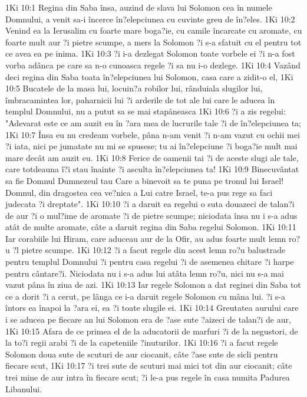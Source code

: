 1Ki 10:1  Regina din Saba însa, auzind de slava lui Solomon cea în numele Domnului, a venit sa-i încerce în?elepciunea cu cuvinte greu de în?eles.
1Ki 10:2  Venind ea la Ierusalim cu foarte mare boga?ie, cu camile încarcate cu aromate, cu foarte mult aur ?i pietre scumpe, a mers la Solomon ?i s-a sfatuit cu el pentru tot ce avea ea pe inima.
1Ki 10:3  ?i i-a dezlegat Solomon toate vorbele ei ?i n-a fost vorba adânca pe care sa n-o cunoasca regele ?i sa nu i-o dezlege.
1Ki 10:4  Vazând deci regina din Saba toata în?elepciunea lui Solomon, casa care a zidit-o el,
1Ki 10:5  Bucatele de la masa lui, locuin?a robilor lui, rânduiala slugilor lui, îmbracamintea lor, paharnicii lui ?i arderile de tot ale lui care le aducea în templul Domnului, nu a putut sa se mai stapâneasca
1Ki 10:6  ?i a zis regelui: "Adevarat este ce am auzit eu în ?ara mea de lucrurile tale ?i de în?elepciunea ta;
1Ki 10:7  Însa eu nu credeam vorbele, pâna n-am venit ?i n-am vazut cu ochii mei ?i iata, nici pe jumatate nu mi se spusese; tu ai în?elepciune ?i boga?ie mult mai mare decât am auzit eu.
1Ki 10:8  Ferice de oamenii tai ?i de aceste slugi ale tale, care totdeauna î?i stau înainte ?i asculta în?elepciunea ta!
1Ki 10:9  Binecuvântat sa fie Domnul Dumnezeul tau Care a binevoit sa te puna pe tronul lui Israel! Domnul, din dragostea cea ve?nica a Lui catre Israel, te-a pus rege sa faci judecata ?i dreptate".
1Ki 10:10  ?i a daruit ea regelui o suta douazeci de talan?i de aur ?i o mul?ime de aromate ?i de pietre scumpe; niciodata însa nu i s-a adus atât de multe aromate, câte a daruit regina din Saba regelui Solomon.
1Ki 10:11  Iar corabiile lui Hiram, care aduceau aur de la Ofir, au adus foarte mult lemn ro?u ?l pietre scumpe.
1Ki 10:12  ?i a facut regele din acest lemn ro?u balustrade pentru templul Domnului ?i pentru casa regelui ?i de asemenea chitare ?i harpe pentru cântare?i. Niciodata nu i s-a adus lui atâta lemn ro?u, nici nu s-a mai vazut pâna în ziua de azi.
1Ki 10:13  Iar regele Solomon a dat reginei din Saba tot ce a dorit ?i a cerut, pe lânga ce i-a daruit regele Solomon cu mâna lui. ?i s-a întors ea înapoi la ?ara ei, ea ?i toate slugile ei.
1Ki 10:14  Greutatea aurului care i se aducea pe fiecare an lui Solomon era de ?ase sute ?aizeci de talan?i de aur,
1Ki 10:15  Afara de ce primea el de la aducatorii de marfuri ?i de la negustori, de la to?i regii arabi ?i de la capeteniile ?inuturilor.
1Ki 10:16  ?i a facut regele Solomon doua sute de scuturi de aur ciocanit, câte ?ase sute de sicli pentru fiecare scut,
1Ki 10:17  ?i trei sute de scuturi mai mici tot din aur ciocanit; câte trei mine de aur intra în fiecare scut; ?i le-a pus regele în casa numita Padurea Libanului.
